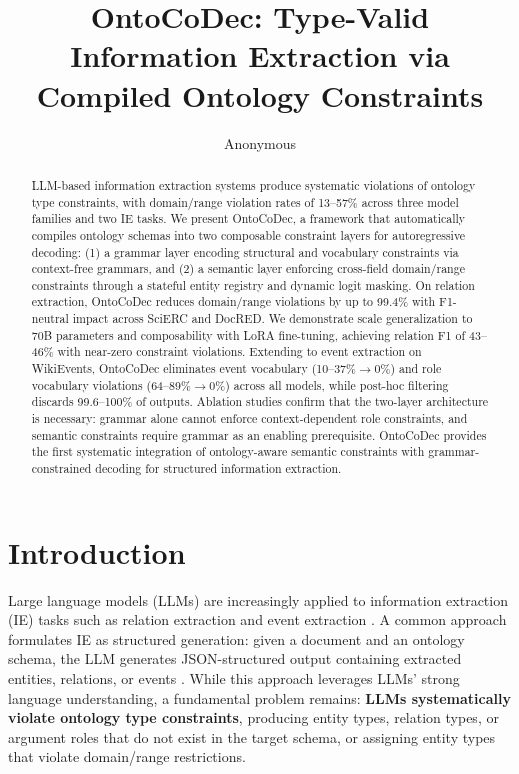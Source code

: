 \documentclass[11pt]{article}
\title{OntoCoDec: Type-Valid Information Extraction via Compiled Ontology Constraints}
\author{Anonymous}
\begin{document}
\maketitle

\begin{abstract}
LLM-based information extraction systems produce systematic violations of ontology type constraints, with domain/range violation rates of 13--57\% across three model families and two IE tasks.
We present OntoCoDec, a framework that automatically compiles ontology schemas into two composable constraint layers for autoregressive decoding: (1) a grammar layer encoding structural and vocabulary constraints via context-free grammars, and (2) a semantic layer enforcing cross-field domain/range constraints through a stateful entity registry and dynamic logit masking.
On relation extraction, OntoCoDec reduces domain/range violations by up to 99.4\% with F1-neutral impact across SciERC and DocRED.
We demonstrate scale generalization to 70B parameters and composability with LoRA fine-tuning, achieving relation F1 of 43--46\% with near-zero constraint violations.
Extending to event extraction on WikiEvents, OntoCoDec eliminates event vocabulary (10--37\%$\to$0\%) and role vocabulary violations (64--89\%$\to$0\%) across all models, while post-hoc filtering discards 99.6--100\% of outputs.
Ablation studies confirm that the two-layer architecture is necessary: grammar alone cannot enforce context-dependent role constraints, and semantic constraints require grammar as an enabling prerequisite.
OntoCoDec provides the first systematic integration of ontology-aware semantic constraints with grammar-constrained decoding for structured information extraction.
\end{abstract}

\section{Introduction}

Large language models (LLMs) are increasingly applied to information extraction (IE) tasks such as relation extraction and event extraction \cite{wadhwa2023revisiting,xu2023large}.
A common approach formulates IE as structured generation: given a document and an ontology schema, the LLM generates JSON-structured output containing extracted entities, relations, or events \cite{li2023codeie,sainz2024gollie}.
While this approach leverages LLMs' strong language understanding, a fundamental problem remains: \textbf{LLMs systematically violate ontology type constraints}, producing entity types, relation types, or argument roles that do not exist in the target schema, or assigning entity types that violate domain/range restrictions.
\end{document}

